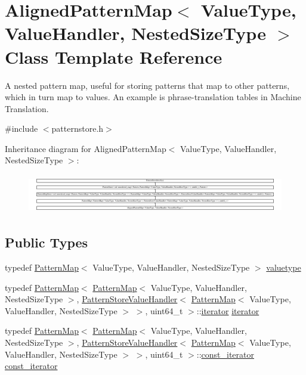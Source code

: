 \hypertarget{classAlignedPatternMap}{}\section{Aligned\+Pattern\+Map$<$ Value\+Type, Value\+Handler, Nested\+Size\+Type $>$ Class Template Reference}
\label{classAlignedPatternMap}


A nested pattern map, useful for storing patterns that map to other patterns, which in turn map to values. An example is phrase-\/translation tables in Machine Translation.  




{\ttfamily \#include $<$patternstore.\+h$>$}

Inheritance diagram for Aligned\+Pattern\+Map$<$ Value\+Type, Value\+Handler, Nested\+Size\+Type $>$\+:\begin{figure}[H]
\begin{center}
\leavevmode
\includegraphics[height=1.722017cm]{classAlignedPatternMap}
\end{center}
\end{figure}
\subsection*{Public Types}
\begin{DoxyCompactItemize}
\item 
typedef \hyperlink{classPatternMap}{Pattern\+Map}$<$ Value\+Type, Value\+Handler, Nested\+Size\+Type $>$ \hyperlink{classAlignedPatternMap_a5b139dad8d98612f62fc561a1e29153d}{valuetype}
\item 
typedef \hyperlink{classPatternMap}{Pattern\+Map}$<$ \hyperlink{classPatternMap}{Pattern\+Map}$<$ Value\+Type, Value\+Handler, Nested\+Size\+Type $>$, \hyperlink{classPatternStoreValueHandler}{Pattern\+Store\+Value\+Handler}$<$ \hyperlink{classPatternMap}{Pattern\+Map}$<$ Value\+Type, Value\+Handler, Nested\+Size\+Type $>$ $>$, uint64\+\_\+t $>$\+::\hyperlink{classAlignedPatternMap_ac784198ebf47e631d2feb1c9d6063b1b}{iterator} \hyperlink{classAlignedPatternMap_ac784198ebf47e631d2feb1c9d6063b1b}{iterator}
\item 
typedef \hyperlink{classPatternMap}{Pattern\+Map}$<$ \hyperlink{classPatternMap}{Pattern\+Map}$<$ Value\+Type, Value\+Handler, Nested\+Size\+Type $>$, \hyperlink{classPatternStoreValueHandler}{Pattern\+Store\+Value\+Handler}$<$ \hyperlink{classPatternMap}{Pattern\+Map}$<$ Value\+Type, Value\+Handler, Nested\+Size\+Type $>$ $>$, uint64\+\_\+t $>$\+::\hyperlink{classAlignedPatternMap_a1dd59a53ad5586979698949f2845a1ee}{const\+\_\+iterator} \hyperlink{classAlignedPatternMap_a1dd59a53ad5586979698949f2845a1ee}{const\+\_\+iterator}
\end{DoxyCompactItemize}

